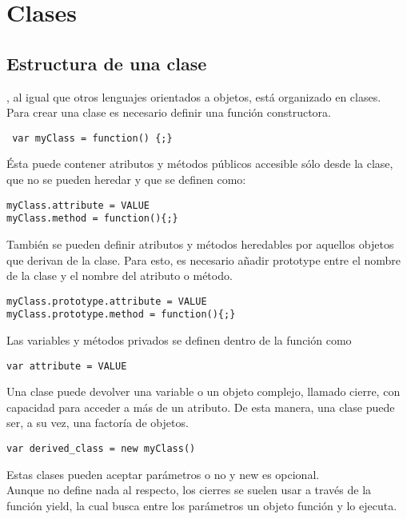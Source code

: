 \section{Clases}
\label{sec:clases}

\subsection{Estructura de una clase}
\label{subsection:estructura}

\lluvia, al igual que otros lenguajes orientados a objetos, está organizado en clases.\\

Para crear una clase es necesario definir una función constructora. 
\begin{verbatim}
 var myClass = function() {;} 
\end{verbatim}

Ésta puede contener atributos y métodos públicos accesible sólo desde la clase, que no se pueden heredar y que se definen como:
\begin{verbatim}
myClass.attribute = VALUE
myClass.method = function(){;}
\end{verbatim}

También se pueden definir atributos y métodos heredables por aquellos objetos que derivan de la clase. 
Para esto, es necesario añadir prototype entre el nombre de la clase y el nombre del atributo o método. 
\begin{verbatim}
myClass.prototype.attribute = VALUE
myClass.prototype.method = function(){;}
\end{verbatim}

Las variables y métodos privados se definen dentro de la función como
\begin{verbatim}
var attribute = VALUE
\end{verbatim}

Una clase puede devolver una variable o un objeto complejo, llamado cierre, con capacidad para acceder a más de un atributo. 
De esta manera, una clase puede ser, a su vez, una factoría de objetos.
\begin{verbatim}
var derived_class = new myClass()
\end{verbatim}

Estas clases pueden aceptar parámetros o no y new es opcional.\\

Aunque \lluvia{} no define nada al respecto, los cierres se suelen usar a través de la función yield, la cual busca entre los parámetros 
un objeto función y lo ejecuta.\\

